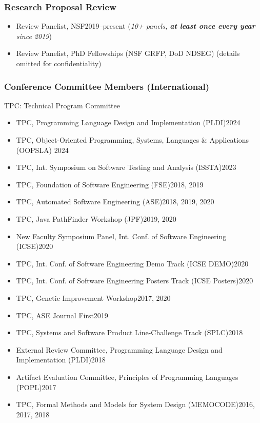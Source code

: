 \documentclass[11pt]{article}
\begin{document}
\subsubsection{Research Proposal Review}
\begin{itemize}
    \item Review Panelist, NSF\hfill 2019--present (\emph{10+ panels, \textbf{at least once every year} since 2019})
    \item Review Panelist, PhD Fellowships (NSF GRFP, DoD NDSEG) \hfill (details omitted for confidentiality)
\end{itemize}

\subsubsection{Conference Committee Members (International)}

\begin{description}[before=\small]
    \item TPC: Technical Program Committee
\end{description}

\begin{itemize}
    \item TPC, Programming Language Design and Implementation (PLDI)\hfill 2024
    \item TPC, Object-Oriented Programming, Systems, Languages \& Applications (OOPSLA) \hfill 2024
    \item TPC,  Int. Symposium on Software Testing and Analysis (ISSTA)\hfill 2023
    \item TPC, Foundation of Software Engineering (FSE)\hfill 2018, 2019
    \item TPC, Automated Software Engineering (ASE)\hfill 2018, 2019, 2020
    \item TPC, Java PathFinder Workshop (JPF)\hfill 2019, 2020
    \item New Faculty Symposium Panel, Int. Conf. of Software Engineering (ICSE)\hfill 2020
    \item TPC, Int. Conf. of Software Engineering Demo Track (ICSE DEMO)\hfill 2020
    \item TPC, Int. Conf. of Software Engineering Posters Track (ICSE Posters)\hfill 2020
    \item TPC, Genetic Improvement Workshop\hfill 2017, 2020
    \item TPC, ASE Journal First\hfill 2019
    \item TPC, Systems and Software Product Line-Challenge Track (SPLC)\hfill 2018
    \item External Review Committee, Programming Language Design and Implementation (PLDI)\hfill 2018
    \item Artifact Evaluation Committee, Principles of Programming Languages (POPL)\hfill 2017
    \item TPC, Formal Methods and Models for System Design (MEMOCODE)\hfill 2016, 2017, 2018
\end{itemize}
\end{document}

